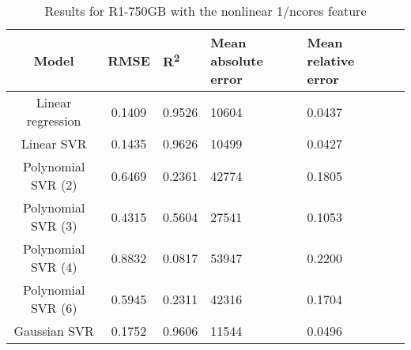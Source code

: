 \begin{table}[H]
\centering
\begin{adjustbox}{center}
\begin{tabular}{c | c M{1.2cm} M{2.5cm} M{2.5cm} M{1.8cm}}
Model & RMSE & R\textsuperscript{2} & Mean absolute error & Mean relative error \tabularnewline
\hline
Linear regression & 0.1409 & 0.9526 &  10604 & 0.0437 \\
Linear SVR & 0.1435 & 0.9626 &  10499 & 0.0427 \\
Polynomial SVR (2) & 0.6469 & 0.2361 &  42774 & 0.1805 \\
Polynomial SVR (3) & 0.4315 & 0.5604 &  27541 & 0.1053 \\
Polynomial SVR (4) & 0.8832 & 0.0817 &  53947 & 0.2200 \\
Polynomial SVR (6) & 0.5945 & 0.2311 &  42316 & 0.1704 \\
Gaussian SVR & 0.1752 & 0.9606 &  11544 & 0.0496 \\
\end{tabular}
\end{adjustbox}
\\
\caption{Results for R1-750GB with the nonlinear 1/ncores feature}
\label{tab:all_nonlinear_R1_750}
\end{table}
